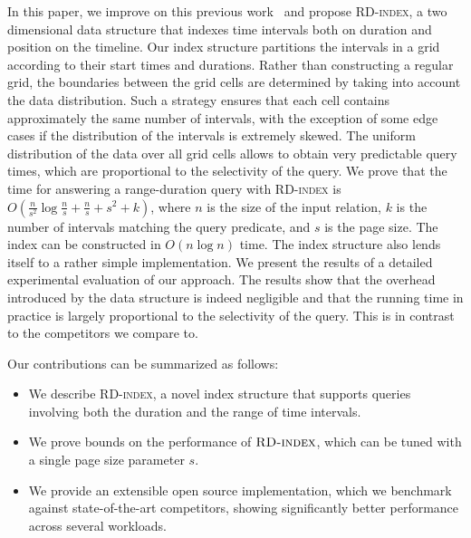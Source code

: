 \documentclass[sigconf,nonacm,anonymous]{acmart}
\theoremstyle{definition}
\newcommand{\algo}[1]{\textsc{#1}}
\newcommand{\rd}{\algo{RD-index}\xspace}
\begin{document}
In this paper, we improve on this previous
work~\cite{BehrendDGSVRK_SSTD19_period-index} and propose \rd, a two
dimensional data structure that indexes time intervals both on
duration and position on the timeline.  Our index structure partitions
the intervals in a grid according to their start times and
durations. Rather than constructing a regular grid, the boundaries
between the grid cells are determined by taking into account the data
distribution.  Such a strategy ensures that each cell contains
approximately the same number of intervals, with the exception of some
edge cases if the distribution of the intervals is extremely skewed.
The uniform distribution of the data over all grid cells allows to
obtain very predictable query times, which are proportional to the
selectivity of the query.  We prove that the time for answering a
range-duration query with \rd is
$O(\frac{n}{s^2} \log \frac{n}{s} + \frac{n}{s} + s^2 + k)$, where $n$
is the size of the input relation, $k$ is the number of intervals
matching the query predicate, and $s$ is the page size.  The index can
be constructed in $O(n \log n)$ time.
The index structure also lends itself to a rather simple
implementation.
%
We present the results of a detailed experimental evaluation of our
approach. The results show that the overhead introduced by the data
structure is indeed negligible and that the running time in practice
is largely proportional to the selectivity of the query.  This is in
contrast to the competitors we compare to.

Our contributions can be summarized as follows:
\begin{itemize}
\item We describe \rd, a novel index structure that supports queries
  involving both the duration and the range of time intervals.
\item We prove bounds on the performance of $\rd$, which can be tuned
  with a single page size parameter $s$.
\item We provide an extensible open source implementation, which we
  benchmark against state-of-the-art competitors, showing
  significantly better performance across several workloads.
\end{itemize}
\end{document}
